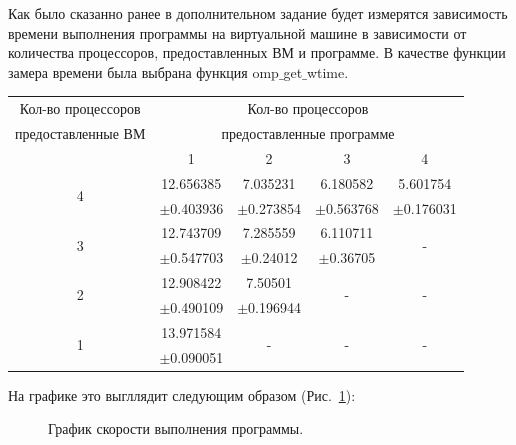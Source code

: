 \documentclass{article}
\begin{document}
			Как было сказанно ранее в дополнительном задание будет измерятся зависимость времени выполнения программы на 					виртуальной	машине в зависимости от количества процессоров, предоставленных ВМ и программе. В качестве функции замера 				времени была выбрана функция omp$\_$get$\_$wtime.
			
		\begin{table}[h!]
			\begin{tabular}{|c|c|c|c|c|}
			\hline
			Кол-во процессоров 	& \multicolumn{4}{|c|}{Кол-во процессоров} 										\\
			предоставленные ВМ 	& \multicolumn{4}{|c|}{предоставленные программе}								\\
			\cline{2-5}
								&		1			& 		2			&		3			&		4			\\
			\hline	
			\multirow{2}{*}{4} 	&	12.656385 		&	7.035231		&	6.180582		&	5.601754		\\
								&	$\pm$0.403936 	&  $\pm$0.273854	& $\pm$0.563768 	&$\pm$0.176031		\\
			\hline
			\multirow{2}{*}{3} 	&	12.743709	 	&	7.285559		&	6.110711		&\multirow{2}{*}{-}	\\
								&	$\pm$0.547703	& 	$\pm$0.24012	&   $\pm$0.36705	&					\\
			\hline			
			\multirow{2}{*}{2} 	&	12.908422		&	7.50501			&\multirow{2}{*}{-}	&\multirow{2}{*}{-}	\\
								&   $\pm$0.490109	& $\pm$0.196944		&					&					\\
			\hline					
			\multirow{2}{*}{1} 	&	13.971584		&\multirow{2}{*}{-}	&\multirow{2}{*}{-}	&\multirow{2}{*}{-}	\\					
								&   $\pm$0.090051	&					&					&					\\
			\hline				
			\end{tabular}		
		\end{table}	
	\newpage			
			
			На графике это выгллядит следующим образом (Рис.~\ref{ris:Dop}):

		\begin{figure}[h!]
			\caption{График скорости выполнения программы.}
			\label{ris:Dop}
		\end{figure}		
		
\end{document}
